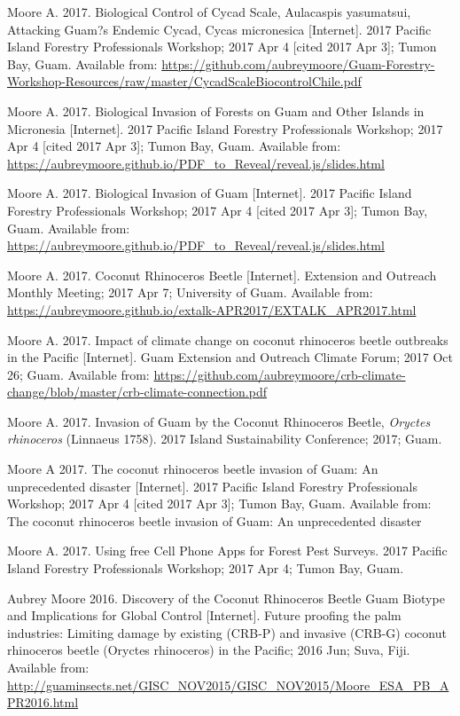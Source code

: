 \documentclass[12pt,english]{simplecv}
\begin{document}
\begin{thebibliography}{999}
\bibitem{}Moore A. 2017. Biological Control of Cycad Scale, Aulacaspis yasumatsui, Attacking Guam?s Endemic Cycad, Cycas micronesica [Internet]. 2017 Pacific Island Forestry Professionals Workshop; 2017 Apr 4 [cited 2017 Apr 3]; Tumon Bay, Guam. Available from: \url{https://github.com/aubreymoore/Guam-Forestry-Workshop-Resources/raw/master/CycadScaleBiocontrolChile.pdf}
 
\bibitem{}Moore A. 2017. Biological Invasion of Forests on Guam and Other Islands in Micronesia [Internet]. 2017 Pacific Island Forestry Professionals Workshop; 2017 Apr 4 [cited 2017 Apr 3]; Tumon Bay, Guam. Available from: \url{https://aubreymoore.github.io/PDF\_to\_Reveal/reveal.js/slides.html}
 
\bibitem{}Moore A. 2017. Biological Invasion of Guam [Internet]. 2017 Pacific Island Forestry Professionals Workshop; 2017 Apr 4 [cited 2017 Apr 3]; Tumon Bay, Guam. Available from: \url{https://aubreymoore.github.io/PDF\_to\_Reveal/reveal.js/slides.html}
 
\bibitem{}Moore A. 2017. Coconut Rhinoceros Beetle [Internet]. Extension and Outreach Monthly Meeting; 2017 Apr 7; University of Guam. Available from: \url{https://aubreymoore.github.io/extalk-APR2017/EXTALK\_APR2017.html}
 
\bibitem{}Moore A. 2017.  Impact of climate change on coconut rhinoceros beetle outbreaks in the Pacific [Internet]. Guam Extension and Outreach Climate Forum; 2017 Oct 26; Guam. Available from: \url{https://github.com/aubreymoore/crb-climate-change/blob/master/crb-climate-connection.pdf}
 
\bibitem{}Moore A. 2017. Invasion of Guam by the Coconut Rhinoceros Beetle, \emph{Oryctes rhinoceros} (Linnaeus 1758). 2017 Island Sustainability Conference; 2017; Guam. 
 
\bibitem{}Moore A 2017. The coconut rhinoceros beetle invasion of Guam: An unprecedented disaster [Internet]. 2017 Pacific Island Forestry Professionals Workshop; 2017 Apr 4 [cited 2017 Apr 3]; Tumon Bay, Guam. Available from: The coconut rhinoceros beetle invasion of Guam: An unprecedented disaster
 
\bibitem{}Moore A. 2017. Using free Cell Phone Apps for Forest Pest Surveys. 2017 Pacific Island Forestry Professionals Workshop; 2017 Apr 4; Tumon Bay, Guam. 

 
\bibitem{}Aubrey Moore 2016. Discovery of the Coconut Rhinoceros Beetle Guam Biotype and Implications for Global Control [Internet]. Future proofing the palm industries: Limiting damage by existing (CRB-P) and invasive (CRB-G) coconut rhinoceros beetle (Oryctes rhinoceros) in the Pacific; 2016 Jun; Suva, Fiji. Available from: \url{http://guaminsects.net/GISC\_NOV2015/GISC\_NOV2015/Moore\_ESA\_PB\_APR2016.html}


\end{thebibliography}
\end{document}
